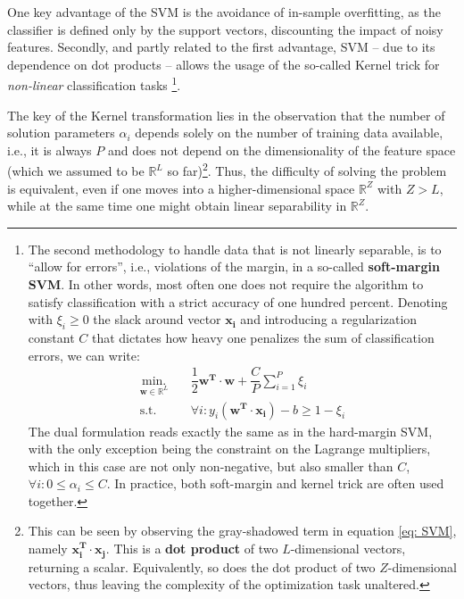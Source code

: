 \begin{enumerate}[(1)]
One key advantage of the SVM is the avoidance of in-sample overfitting, as the classifier is defined only by the support vectors, discounting the impact of noisy features. Secondly, and partly related to the first advantage, SVM -- due to its dependence on dot products -- allows the usage of the so-called Kernel trick for \textit{non-linear} classification tasks \parencite{GuoShiTu2017}\footnote{The second methodology to handle data that is not linearly separable, is to \enquote{allow for errors}, i.e., violations of the margin, in a so-called \textbf{soft-margin SVM}. In other words, most often one does not require the algorithm to satisfy classification with a strict accuracy of one hundred percent. Denoting with $\xi_i \geq 0$ the slack around vector $\mathbf{x_i}$ and introducing a regularization constant $C$ that dictates how heavy one penalizes the sum of classification errors, we can write:
\begin{align*}
\underset{\mathbf{w} \in \mathbb{R}^L}{\text{min.}} \quad & \dfrac{1}{2} \mathbf{w^T} \cdot \mathbf{w} + \dfrac{C}{P}  \sum_{i=1}^P \xi_i \\
\text{s.t.} \quad & \forall i: y_i (\mathbf{w^T} \cdot \mathbf{x_i}) - b \geq 1 - \xi_i
\end{align*}
The dual formulation reads exactly the same as in the hard-margin SVM, with the only exception being the constraint on the Lagrange multipliers, which in this case are not only non-negative, but also smaller than $C$, $\forall i: 0 \leq \alpha_i \leq C$. In practice, both soft-margin and kernel trick are often used together.}. 

The key of the Kernel transformation lies in the observation that the number of solution parameters $\alpha_i$ depends solely on the number of training data available, i.e., it is always $P$ and does not depend on the dimensionality of the feature space (which we assumed to be $\mathbb{R}^L$ so far)\footnote{This can be seen by observing the gray-shadowed term in equation \eqref{eq: SVM}, namely $ \mathbf{x_i^T} \cdot \mathbf{x_j} $. This is a \textbf{dot product} of two $L$-dimensional vectors, returning a scalar. Equivalently, so does the dot product of two $Z$-dimensional vectors, thus leaving the complexity of the optimization task unaltered.}. Thus, the difficulty of solving the problem is equivalent, even if one moves into a higher-dimensional space $\mathbb{R}^Z$ with $Z>L$, while at the same time one might obtain linear separability in $\mathbb{R}^Z$. 


\end{enumerate}
